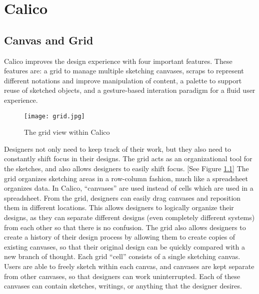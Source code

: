 \chapter{Calico}


\section{Canvas and Grid}

Calico improves the design experience with four important features. These features are: a grid to manage multiple sketching canvases, scraps to represent different notations and improve manipulation of content, a palette to support reuse of sketched objects, and a gesture-based interation paradigm for a fluid user experience.


\begin{figure}[htb]
  \centering
  \texttt{[image: grid.jpg]}
  \caption{The grid view within Calico}
  \label{fig:grid}
\end{figure}

Designers not only need to keep track of their work, but they also need to constantly shift focus in their designs.
The grid acts as an organizational tool for the sketches, and also allows designers to easily shift focus. [See Figure \ref{fig:grid}]
The grid organizes sketching areas in a row-column fashion, much like a spreadsheet organizes data. 
In Calico, ``canvases'' are used instead of cells which are used in a spreadsheet.
From the grid, designers can easily drag canvases and reposition them in different locations. This allows designers to logically organize their designs, as they can separate different designs (even completely different systems) from each other so that there is no confusion. 
The grid also allows designers to create a history of their design process by allowing them to create copies of existing canvases, so that their original design can be quickly compared with a new branch of thought. Each grid ``cell'' consists of a single sketching canvas. Users are able to freely sketch within each canvas, and canvases are kept separate from other canvases, so that designers can work uninterrupted. Each of these canvases can contain sketches, writings, or anything that the designer desires. 



